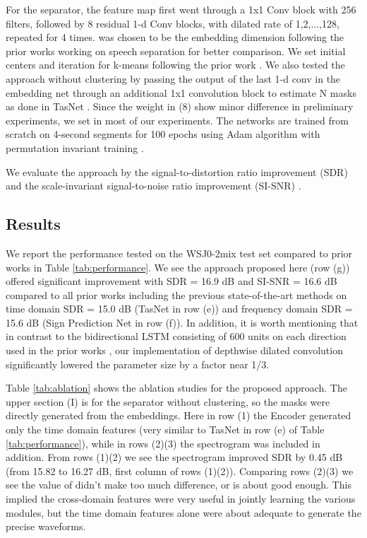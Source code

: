 \documentclass[a4paper]{article}
\begin{document}
For the separator, the feature map  first went through a 1x1 Conv block with 256 filters, followed by 8 residual 1-d Conv blocks, with dilated rate of 1,2,...,128, repeated for 4 times.  was chosen to be the embedding dimension following the prior works \cite{hershey2016deep, luo2018speaker, wang2018alternative, wang2018deep} working on speech separation for better comparison. We set  initial centers and  iteration for k-means following the prior work \cite{luo2018speaker}. We also tested the approach without clustering by passing the output of the last 1-d conv in the embedding net through an additional 1x1 convolution block to estimate N masks as done in TasNet \cite{luo2018tasnet}. 
Since the weight  in (8) show minor difference in preliminary experiments, we set  in most of our experiments. 
The networks are trained from scratch on 4-second segments for 100 epochs using Adam algorithm with permutation invariant training \cite{yu2017permutation, kolbaek2017multitalker}. 



We evaluate the approach by the signal-to-distortion ratio improvement (SDR) \cite{vincent2006performance} and the scale-invariant signal-to-noise ratio improvement (SI-SNR) \cite{luo2018speaker}. 









\subsection{Results}

We report the performance tested on the WSJ0-2mix test set compared to prior works in Table \ref{tab:performance}. We see the approach proposed here (row (g)) offered significant improvement with SDR = 16.9 dB and SI-SNR = 16.6 dB compared to all prior works including the previous state-of-the-art methods on time domain SDR = 15.0 dB (TasNet \cite{luo2018tasnet} in row (e)) and frequency domain SDR = 15.6 dB (Sign Prediction Net \cite{wang2018deep} in row (f)). In addition, it is worth mentioning that in contrast to the bidirectional LSTM consisting of 600 units on each direction used in the prior works \cite{wang2018alternative, wang2018deep}, our implementation of depthwise dilated convolution significantly lowered the parameter size by a factor near 1/3.


Table \ref{tab:ablation} shows the ablation studies for the proposed approach. The upper section (I) is for the separator without clustering, so the masks were directly generated from the embeddings. Here in row (1) the Encoder generated only the time domain features (very similar to TasNet \cite{luo2018tasnet} in row (e) of Table \ref{tab:performance}), while in rows (2)(3) the spectrogram was included in addition. From rows (1)(2) we see the spectrogram improved SDR by 0.45 dB (from 15.82 to 16.27 dB, first column of rows (1)(2)). Comparing rows (2)(3) we see the value of  didn't make too much difference, or  is about good enough. This implied the cross-domain features were very useful in jointly learning the various modules, but the time domain features alone were about adequate to generate the precise waveforms.
\end{document}
